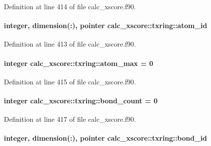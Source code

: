 Definition at line 414 of file calc\-\_\-xscore.\-f90.

\hypertarget{structcalc__xscore_1_1txring_ab5983392042485d218c47052ccf46ec4}{
\paragraph[{atom\-\_\-id}]{\setlength{\rightskip}{0pt plus 5cm}integer, dimension(\-:), pointer calc\-\_\-xscore\-::txring\-::atom\-\_\-id}}\label{structcalc__xscore_1_1txring_ab5983392042485d218c47052ccf46ec4}


Definition at line 413 of file calc\-\_\-xscore.\-f90.

\hypertarget{structcalc__xscore_1_1txring_a133ec60650d0977a33ffb81439f162bd}{
\paragraph[{atom\-\_\-max}]{\setlength{\rightskip}{0pt plus 5cm}integer calc\-\_\-xscore\-::txring\-::atom\-\_\-max = 0}}\label{structcalc__xscore_1_1txring_a133ec60650d0977a33ffb81439f162bd}


Definition at line 415 of file calc\-\_\-xscore.\-f90.

\hypertarget{structcalc__xscore_1_1txring_afc8a746aa23622b07a538950ed48746a}{
\paragraph[{bond\-\_\-count}]{\setlength{\rightskip}{0pt plus 5cm}integer calc\-\_\-xscore\-::txring\-::bond\-\_\-count = 0}}\label{structcalc__xscore_1_1txring_afc8a746aa23622b07a538950ed48746a}


Definition at line 417 of file calc\-\_\-xscore.\-f90.

\hypertarget{structcalc__xscore_1_1txring_abcca741ddceed03c2de24ee66c0c74ce}{
\paragraph[{bond\-\_\-id}]{\setlength{\rightskip}{0pt plus 5cm}integer, dimension(\-:), pointer calc\-\_\-xscore\-::txring\-::bond\-\_\-id}}\label{structcalc__xscore_1_1txring_abcca741ddceed03c2de24ee66c0c74ce}


